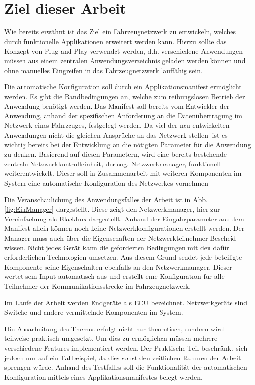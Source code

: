 \section{Ziel dieser Arbeit}
Wie bereits erwähnt ist das Ziel ein Fahrzeugnetzwerk zu entwickeln, welches durch funktionelle Applikationen erweitert werden kann. Hierzu sollte das Konzept von Plug and Play verwendet werden, d.h. verschiedene Anwendungen müssen aus einem zentralen Anwendungsverzeichnis geladen werden können und ohne manuelles Eingreifen in das Fahrzeugnetzwerk lauffähig sein. 

Die automatische Konfiguration soll durch ein Applikationsmanifest ermöglicht werden. Es gibt die Randbedingungen an, welche zum reibungslosen Betrieb der Anwendung benötigt werden. Das Manifest soll bereits vom Entwickler der Anwendung, anhand der spezifischen Anforderung an die Datenübertragung im Netzwerk eines Fahrzeuges, festgelegt werden. Da viel der neu entwickelten Anwendungen nicht die gleichen Ansprüche an das Netzwerk stellen, ist es wichtig bereits bei der Entwicklung an die nötigten Parameter für die Anwendung zu denken. Basierend auf diesen Parametern, wird eine bereits bestehende zentrale Netzwerkkontrolleinheit, der sog. Netzwerkmanager, funktionell weiterentwickelt. Dieser soll in Zusammenarbeit mit weiteren Komponenten im System eine automatische Konfiguration des Netzwerkes vornehmen.

Die Veranschaulichung des Anwendungsfalles der Arbeit ist in Abb.\ref{fig:EinManager} dargestellt. Diese zeigt den Netzwerkmanager, hier zur Vereinfachung als Blackbox dargestellt. Anhand der Eingabeparameter aus dem Manifest allein können noch keine Netzwerkkonfigurationen erstellt werden. Der Manager muss auch über die Eigenschaften der Netzwerkteilnehmer Bescheid wissen. Nicht jedes Gerät kann die geforderten Bedingungen mit den dafür erforderlichen Technologien umsetzen. Aus diesem Grund sendet jede beteiligte Komponente seine Eigenschaften ebenfalls an den Netzwerkmanager. Dieser wertet sein Input automatisch aus und erstellt eine Konfiguration für alle Teilnehmer der Kommunikationsstrecke im Fahrzeugnetzwerk.


Im Laufe der Arbeit werden Endgeräte als \acf{ECU} bezeichnet. Netzwerkgeräte sind Switche und andere vermittelnde Komponenten im System.

Die Ausarbeitung des Themas erfolgt nicht nur theoretisch, sondern wird teilweise praktisch umgesetzt. Um dies zu ermöglichen müssen mehrere verschiedene Features implementiert werden. Der Praktische Teil beschränkt sich jedoch nur auf ein Fallbeispiel, da dies sonst den zeitlichen Rahmen der Arbeit sprengen würde. Anhand des Testfalles soll die Funktionalität der automatischen Konfiguration mittels eines Applikationsmanifestes belegt werden.